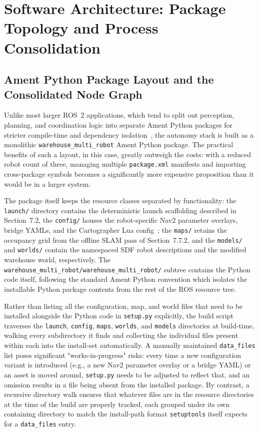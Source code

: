 \section{Software Architecture: Package Topology and Process Consolidation}

\subsection{Ament Python Package Layout and the Consolidated Node Graph}

Unlike most larger ROS~2 applications, which tend to split out perception, planning, and coordination logic into separate Ament Python packages for stricter compile-time and dependency isolation~\cite{macenski2022robot}, the autonomy stack is built as a monolithic \texttt{warehouse\_multi\_robot} Ament Python package. The practical benefits of such a layout, in this case, greatly outweigh the costs: with a reduced robot count of three, managing multiple \texttt{package.xml} manifests and importing cross-package symbols becomes a significantly more expensive proposition than it would be in a larger system.

The package itself keeps the resource classes separated by functionality: the \texttt{launch/} directory contains the deterministic launch scaffolding described in Section~7.2, the \texttt{config/} houses the robot-specific Nav2 parameter overlays, bridge YAMLs, and the Cartographer Lua config~\cite{macenski2024modular}; the \texttt{maps/} retains the occupancy grid from the offline SLAM pass of Section~7.7.2, and the \texttt{models/} and \texttt{worlds/} contain the namespaced SDF robot descriptions and the modified warehouse world, respectively. The \texttt{warehouse\_multi\_robot\-/warehouse\_multi\_robot/} subtree contains the Python code itself, following the standard Ament Python convention which isolates the installable Python package contents from the rest of the ROS resource tree.

Rather than listing all the configuration, map, and world files that need to be installed alongside the Python code in \texttt{setup.py} explicitly, the build script traverses the \texttt{launch}, \texttt{config}, \texttt{maps}, \texttt{worlds}, and \texttt{models} directories at build-time, walking every subdirectory it finds and collecting the individual files present within each into the install-set automatically. A manually maintained \texttt{data\_files} list poses significant "works-in-progress" risks: every time a new configuration variant is introduced (e.g., a new Nav2 parameter overlay or a bridge YAML) or an asset is moved around, \texttt{setup.py} needs to be adjusted to reflect that, and an omission results in a file being absent from the installed package. By contrast, a recursive directory walk ensures that whatever files are in the resource directories at the time of the build are properly tracked, each grouped under its own containing directory to match the install-path format \texttt{setuptools} itself expects for a \texttt{data\_files} entry.

